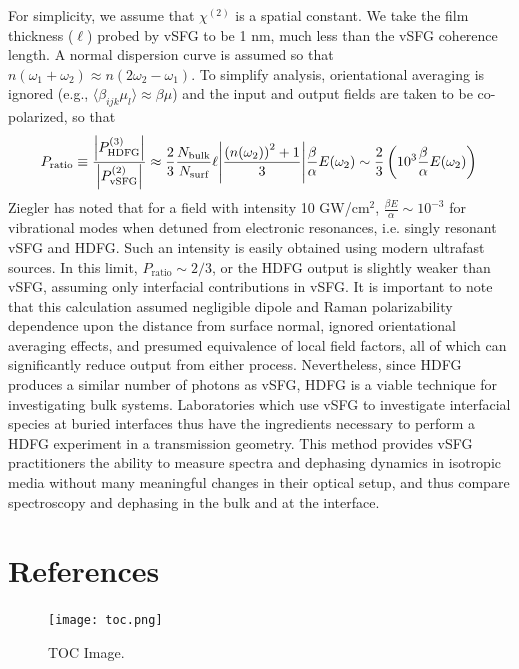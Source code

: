 \documentclass[aip, jcp, reprint, onecolumn, nofootinbib]{revtex4-2}
\begin{document}
For simplicity, we assume that $\chi^{(2)}$ is a spatial constant. 
We take the film thickness ($\ell$) probed by vSFG to be 1 nm, much less than the vSFG coherence length.\cite{RN133}
A normal dispersion curve is assumed so that $n(\omega_1+\omega_2) \approx n(2\omega_2-\omega_1)$.
To simplify analysis, orientational averaging is ignored (e.g., $\langle \beta_{ijk} \mu_{l} \rangle \approx \beta \mu$) and the input and output fields are taken to be co-polarized, so that
\begin{equation}
	P_\text{ratio} \equiv \frac{\abs{P^{(3)}_{\text{HDFG}}}}{\abs{P^{(2)}_{\text{vSFG}}}} \approx \frac{2}{3} \frac{N_\text{bulk}}{N_\text{surf}} \ell \abs{\frac{\left(n(\omega_2)\right)^2 + 1}{3}} \frac{\beta}{\alpha} E(\omega_2) \sim \frac{2}{3} \left(10^3 \frac{\beta}{\alpha} E(\omega_2)\right)\\
\end{equation}
Ziegler has noted that for a field with intensity 10 GW/cm$^{2}$, $\frac{\beta E}{\alpha} \sim 10^{-3} $ for vibrational modes when detuned from electronic resonances, i.e. singly resonant vSFG and HDFG. \cite{RN515}
Such an intensity is easily obtained using modern ultrafast sources.
In this limit, $P_\text{ratio} \sim 2/3$, or the HDFG output is slightly weaker than vSFG, assuming only interfacial contributions in vSFG.
It is important to note that this calculation assumed negligible dipole and Raman polarizability dependence upon the distance from surface normal, ignored orientational averaging effects, and presumed equivalence of local field factors, all of which can significantly reduce output from either process. 
Nevertheless, since HDFG produces a similar number of photons as vSFG, HDFG is a viable technique for investigating bulk systems.
Laboratories which use vSFG to investigate interfacial species at buried interfaces thus have the ingredients necessary to perform a HDFG experiment in a transmission geometry. \cite{Piontek2023_1}
This method provides vSFG practitioners the ability to measure spectra and dephasing dynamics in isotropic media without many meaningful changes in their optical setup, and thus compare spectroscopy and dephasing in the bulk and at the interface.



\section{References}



\begin{figure}[!htbp]
	\centering
	\texttt{[image: toc.png]}
	\caption{
		TOC Image.
	} 
	\label{fig:toc}
\end{figure}
\end{document}
